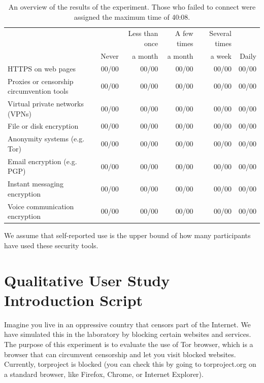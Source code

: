 \documentclass[USenglish,oneside,twocolumn]{article}
\begin{document}
{\begin{table}[h]
\centering
\begin{tabular}{l r r r r r}
& \multicolumn{1}{r}{} & \multicolumn{1}{r}{Less than once} & \multicolumn{1}{r}{A few times}& \multicolumn{1}{r}{Several times}& \multicolumn{1}{r}{}\\
& \multicolumn{1}{r}{Never} & \multicolumn{1}{r}{a month} & \multicolumn{1}{r}{a month}& \multicolumn{1}{r}{a week}& \multicolumn{1}{r}{Daily}\\
\noalign{\hrule}
HTTPS on web pages& 00/00 & 00/00 & 00/00 & 00/00 & 00/00 \\
Proxies or censorship circumvention tools & 00/00 & 00/00 & 00/00 & 00/00 & 00/00 \\
Virtual private networks (VPNs) & 00/00 & 00/00 & 00/00 & 00/00 & 00/00 \\
File or disk encryption & 00/00 & 00/00 & 00/00 & 00/00 & 00/00 \\
Anonymity systems (e.g. Tor) & 00/00 & 00/00 & 00/00 & 00/00 & 00/00 \\
Email encryption (e.g. PGP) & 00/00 & 00/00 & 00/00 & 00/00 & 00/00 \\
Instant messaging encryption & 00/00 & 00/00 & 00/00 & 00/00 & 00/00 \\
Voice communication encryption & 00/00 & 00/00 & 00/00 & 00/00 & 00/00 \\
\end{tabular}
\caption{
An overview of the results of the experiment. Those who
failed to connect were assigned the maximum time of 40:08.
}
\label{table:selfreported-software}
\end{table}

We assume that self-reported use is the upper bound of how many participants have used these security tools.
}

\section{Qualitative User Study Introduction Script} 
\label{qualitative-script} 
Imagine you live in an oppressive country that censors part of the Internet. We have simulated this in the laboratory by blocking certain websites and services.  The purpose of this experiment is to evaluate the use of Tor browser, which is a browser that can circumvent censorship and let you visit blocked websites. Currently, torproject is blocked (you can check this by going to torproject.org on a standard browser, like Firefox, Chrome, or Internet Explorer). 
\end{document}
